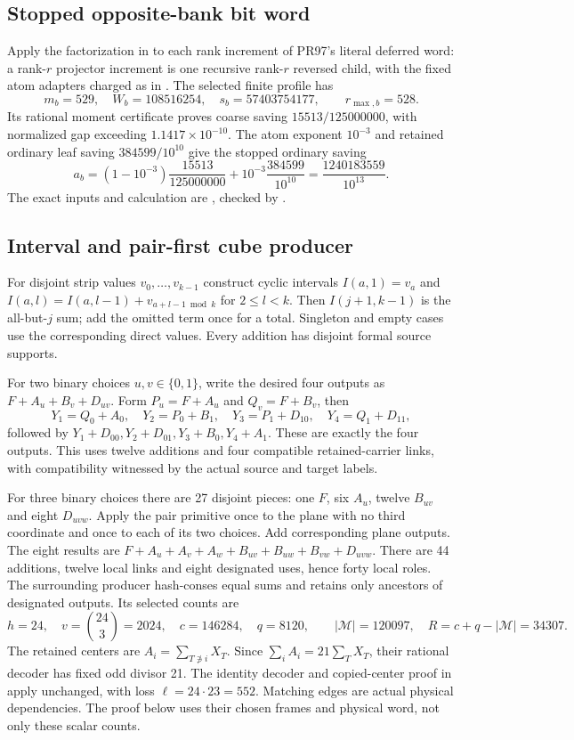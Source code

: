 \subsection{Stopped opposite-bank bit word}
Apply the factorization in 
to each rank increment of PR97's literal deferred word: a rank-$r$
projector increment is one recursive rank-$r$ reversed child, with the
fixed atom adapters charged as in .
The selected finite profile has
\[
 m_b=529,\quad W_b=108516254,\quad s_b=57403754177,
 \qquad r_{\max,b}=528.
\]
Its rational moment certificate proves coarse saving
$15513/125000000$, with normalized gap exceeding $1.1417\times10^{-10}$.
The atom exponent $10^{-3}$ and retained ordinary leaf saving
$384599/10^{10}$ give the stopped ordinary saving
\[
 a_b=(1-10^{-3})\frac{15513}{125000000}
       +10^{-3}\frac{384599}{10^{10}}
     =\frac{1240183559}{10^{13}}.
\]
The exact inputs and calculation are
, checked by
.

\subsection{Interval and pair-first cube producer}
For disjoint strip values $v_0,\ldots,v_{k-1}$ construct cyclic intervals
$I(a,1)=v_a$ and $I(a,l)=I(a,l-1)+v_{a+l-1\bmod k}$ for $2\le l<k$.
Then $I(j+1,k-1)$ is the all-but-$j$ sum; add the omitted term once for
a total. Singleton and empty cases use the corresponding direct values.
Every addition has disjoint formal source supports.

For two binary choices $u,v\in\{0,1\}$, write the desired four outputs as
$F+A_u+B_v+D_{uv}$. Form $P_u=F+A_u$ and $Q_v=F+B_v$, then
\[
 Y_1=Q_0+A_0,\quad Y_2=P_0+B_1,\quad
 Y_3=P_1+D_{10},\quad Y_4=Q_1+D_{11},
\]
followed by $Y_1+D_{00},Y_2+D_{01},Y_3+B_0,Y_4+A_1$.
These are exactly the four outputs. This uses twelve additions and four
compatible retained-carrier links, with compatibility witnessed by the
actual source and target labels.

For three binary choices there are 27 disjoint pieces: one $F$, six
$A_u$, twelve $B_{uv}$ and eight $D_{uvw}$. Apply the pair primitive once
to the plane with no third coordinate and once to each of its two choices.
Add corresponding plane outputs. The eight results are
$F+A_u+A_v+A_w+B_{uv}+B_{uw}+B_{vw}+D_{uvw}$.
There are 44 additions, twelve local links and eight designated uses,
hence forty local roles. The surrounding producer hash-conses equal sums
and retains only ancestors of designated outputs. Its selected counts are
\[
 h=24,\quad v=\binom{24}{3}=2024,\quad c=146284,\quad q=8120,
 \qquad |\mathcal M|=120097,\quad R=c+q-|\mathcal M|=34307.
\]
The retained centers are $A_i=\sum_{T\not\ni i}X_T$.
Since $\sum_i A_i=21\sum_T X_T$, their rational decoder has fixed odd
divisor 21. The identity decoder and copied-center proof in
 apply unchanged, with loss
$\ell=24\cdot23=552$. Matching edges are actual physical dependencies.
The proof below uses their chosen frames and physical word, not only these
scalar counts.
